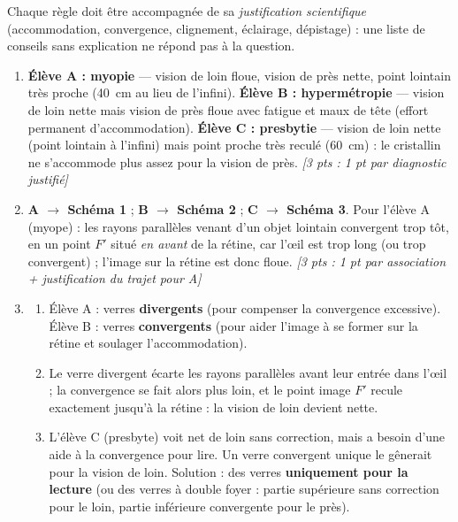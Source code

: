 \documentclass[11pt]{article}
\begin{document}
\begin{attention}
Chaque règle doit être accompagnée de sa \emph{justification scientifique} (accommodation, convergence, clignement, éclairage, dépistage) : une liste de conseils sans explication ne répond pas à la question.
\end{attention}

\begin{corrige}
\begin{enumerate}
\item \textbf{Élève A : myopie} — vision de loin floue, vision de près nette, point lointain très proche (\SI{40}{cm} au lieu de l'infini). \textbf{Élève B : hypermétropie} — vision de loin nette mais vision de près floue avec fatigue et maux de tête (effort permanent d'accommodation). \textbf{Élève C : presbytie} — vision de loin nette (point lointain à l'infini) mais point proche très reculé (\SI{60}{cm}) : le cristallin ne s'accommode plus assez pour la vision de près. \hfill \emph{[3 pts : 1 pt par diagnostic justifié]}
\item \textbf{A $\rightarrow$ Schéma 1} ; \textbf{B $\rightarrow$ Schéma 2} ; \textbf{C $\rightarrow$ Schéma 3}. Pour l'élève A (myope) : les rayons parallèles venant d'un objet lointain convergent trop tôt, en un point $F'$ situé \emph{en avant} de la rétine, car l'œil est trop long (ou trop convergent) ; l'image sur la rétine est donc floue. \hfill \emph{[3 pts : 1 pt par association + justification du trajet pour A]}
\item \begin{enumerate}
\item Élève A : verres \textbf{divergents} (pour compenser la convergence excessive). Élève B : verres \textbf{convergents} (pour aider l'image à se former sur la rétine et soulager l'accommodation).
\item Le verre divergent écarte les rayons parallèles avant leur entrée dans l'œil ; la convergence se fait alors plus loin, et le point image $F'$ recule exactement jusqu'à la rétine : la vision de loin devient nette.
\item L'élève C (presbyte) voit net de loin sans correction, mais a besoin d'une aide à la convergence pour lire. Un verre convergent unique le gênerait pour la vision de loin. Solution : des verres \textbf{uniquement pour la lecture} (ou des verres à double foyer : partie supérieure sans correction pour le loin, partie inférieure convergente pour le près).

\end{enumerate}
\end{enumerate}
\end{corrige}
\end{document}
